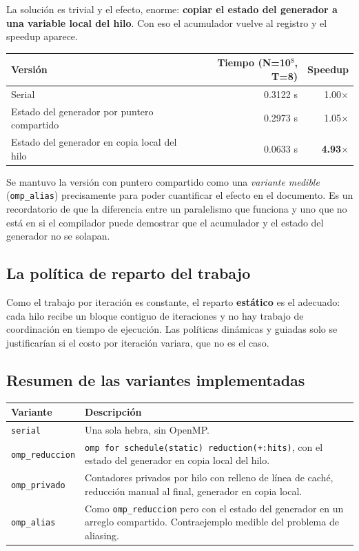 La solución es trivial y el efecto, enorme: \textbf{copiar el estado del generador a una variable local del hilo}. Con eso el acumulador vuelve al registro y el speedup aparece.

\begin{center}
\begin{tabular}{|l|r|r|}
\hline
\textbf{Versión} & \textbf{Tiempo (N=10$^8$, T=8)} & \textbf{Speedup} \\
\hline
Serial & 0.3122 s & 1.00$\times$ \\
Estado del generador por puntero compartido & 0.2973 s & 1.05$\times$ \\
Estado del generador en copia local del hilo & 0.0633 s & \textbf{4.93$\times$} \\
\hline
\end{tabular}
\end{center}

Se mantuvo la versión con puntero compartido como una \emph{variante medible} (\texttt{omp\_alias}) precisamente para poder cuantificar el efecto en el documento. Es un recordatorio de que la diferencia entre un paralelismo que funciona y uno que no está en si el compilador puede demostrar que el acumulador y el estado del generador no se solapan.

\subsection{La política de reparto del trabajo}

Como el trabajo por iteración es constante, el reparto \textbf{estático} es el adecuado: cada hilo recibe un bloque contiguo de iteraciones y no hay trabajo de coordinación en tiempo de ejecución. Las políticas dinámicas y guiadas solo se justificarían si el costo por iteración variara, que no es el caso.

\subsection{Resumen de las variantes implementadas}

\begin{center}
\begin{tabular}{|l|p{8.5cm}|}
\hline
\textbf{Variante} & \textbf{Descripción} \\
\hline
\texttt{serial} & Una sola hebra, sin OpenMP. \\
\hline
\texttt{omp\_reduccion} & \texttt{omp for schedule(static) reduction(+:hits)}, con el estado del generador en copia local del hilo. \\
\hline
\texttt{omp\_privado} & Contadores privados por hilo con relleno de línea de caché, reducción manual al final, generador en copia local. \\
\hline
\texttt{omp\_alias} & Como \texttt{omp\_reduccion} pero con el estado del generador en un arreglo compartido. Contraejemplo medible del problema de aliasing. \\
\hline
\end{tabular}
\end{center}
